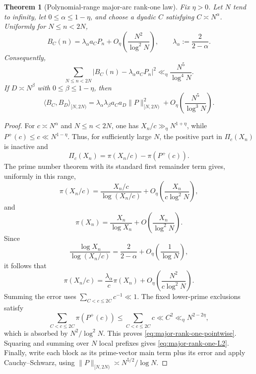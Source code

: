 \documentclass[11pt]{article}
\newtheorem{theorem}{Theorem}[section]
\theoremstyle{definition}
\theoremstyle{remark}
\newcommand{\Pplus}{P^{+}}
\newcommand{\1}{\mathbf{1}}
\begin{document}
\begin{theorem}[Polynomial-range major-arc rank-one law]
\label{thm:major-rank-one}
Fix $\eta>0$.  Let $N$ tend to infinity, let
$0\le\alpha\le1-\eta$, and choose a dyadic $C$ satisfying
$C\asymp N^\alpha$.  Uniformly for $N\le n<2N$,
\begin{equation}
 \boxed{
 B_C(n)
 =\lambda_\alpha a_C P_n
 +O_\eta\!\left(\frac{N^2}{\log^2N}\right),
 \qquad
 \lambda_\alpha:=\frac{2}{2-\alpha}.
 }
 \label{eq:major-rank-one-pointwise}
\end{equation}
Consequently,
\begin{equation}
 \sum_{N\le n<2N}
 \left|B_C(n)-\lambda_\alpha a_C P_n\right|^2
 \ll_\eta \frac{N^5}{\log^4N}.
 \label{eq:major-rank-one-L2}
\end{equation}
If $D\asymp N^\beta$ with $0\le\beta\le1-\eta$, then
\begin{equation}
 \boxed{
 \langle B_C,B_D\rangle_{[N,2N)}
 =\lambda_\alpha\lambda_\beta a_Ca_D
 \|P\|_{[N,2N)}^2
 +O_\eta\!\left(\frac{N^5}{\log^3N}\right).
 }
 \label{eq:major-rank-one-Gram}
\end{equation}
\end{theorem}

\begin{proof}
For $c\asymp N^\alpha$ and $N\le n<2N$, one has
$X_n/c\gg_\eta N^{1+\eta}$, while $\Pplus(c)\le c\ll N^{1-\eta}$.
Thus, for sufficiently large $N$, the positive part in $\Pi_c(X_n)$ is
inactive and
\[
 \Pi_c(X_n)=\pi(X_n/c)-\pi(\Pplus(c)).
\]
The prime number theorem with its standard first remainder term gives,
uniformly in this range,
\[
 \pi(X_n/c)
 =\frac{X_n/c}{\log(X_n/c)}
 +O_\eta\!\left(\frac{X_n}{c\log^2N}\right),
\]
and
\[
 \pi(X_n)
 =\frac{X_n}{\log X_n}
 +O\!\left(\frac{X_n}{\log^2N}\right).
\]
Since
\[
 \frac{\log X_n}{\log(X_n/c)}
 =\frac{2}{2-\alpha}+O_\eta\!\left(\frac1{\log N}\right),
\]
it follows that
\[
 \pi(X_n/c)
 =\frac{\lambda_\alpha}{c}\pi(X_n)
 +O_\eta\!\left(\frac{N^2}{c\log^2N}\right).
\]
Summing the error uses
$\sum_{C<c\le2C}c^{-1}\ll1$.  The fixed lower-prime exclusions satisfy
\[
 \sum_{C<c\le2C}\pi(\Pplus(c))
 \le\sum_{C<c\le2C}c
 \ll C^2
 \ll_\eta N^{2-2\eta},
\]
which is absorbed by $N^2/\log^2N$.  This proves
\cref{eq:major-rank-one-pointwise}.  Squaring and summing over $N$ local
prefixes gives \cref{eq:major-rank-one-L2}.  Finally, write each block as
its prime-vector main term plus its error and apply Cauchy--Schwarz,
using $\|P\|_{[N,2N)}\asymp N^{5/2}/\log N$.
\end{proof}
\end{document}
